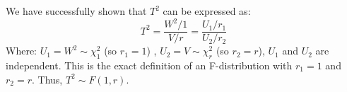 \documentclass{article}
\begin{document}
We have successfully shown that $T^2$ can be expressed as:
$$T^2 = \frac{W^2 / 1}{V / r} = \frac{U_1 / r_1}{U_2 / r_2}$$
Where: $U_1 = W^2 \sim \chi^2_1$ (so $r_1 = 1$) , $U_2 = V \sim \chi^2_r$ (so $r_2 = r$),
$U_1$ and $U_2$ are independent.
This is the exact definition of an F-distribution with $r_1 = 1$ and $r_2 = r$.
Thus, $T^2 \sim F(1, r)$.
\end{document}
